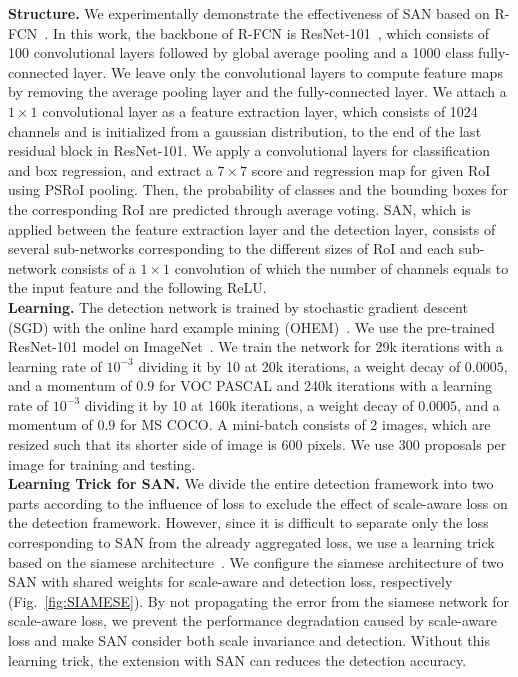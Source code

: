\documentclass[runningheads]{llncs}
\begin{document}
\noindent
\textbf{Structure.}
We experimentally demonstrate the effectiveness of SAN based on R-FCN~\cite{li2016r}.
In this work, the backbone of R-FCN is ResNet-101~\cite{he2016deep}, which consists of 100 convolutional layers followed by global average pooling and a 1000 class fully-connected layer.
We leave only the convolutional layers to compute feature maps by removing the average pooling layer and the fully-connected layer.
We attach a $1\times1$ convolutional layer as a feature extraction layer, which consists of 1024 channels and is initialized from a gaussian distribution, to the end of the last residual block in ResNet-101.
We apply a convolutional layers for classification and box regression, and extract a $7\times7$ score and regression map for given RoI using PSRoI pooling.
Then, the probability of classes and the bounding boxes for the corresponding RoI are predicted through average voting.
SAN, which is applied between the feature extraction layer and the detection layer, consists of several sub-networks corresponding to the different sizes of RoI and each sub-network consists of a $1\times1$ convolution of which the number of channels equals to the input feature and the following ReLU.
\\

\noindent\textbf{Learning.}
The detection network is trained by stochastic gradient descent (SGD) with the online hard example mining (OHEM)~\cite{shrivastava2016training}.
We use the pre-trained ResNet-101 model on ImageNet~\cite{russakovsky2015imagenet}.
We train the network for
29k iterations with a learning rate of $10^{-3}$ dividing it by 10 at 20k iterations, a weight decay of $0.0005$, and a momentum of $0.9$ for VOC PASCAL
and
240k iterations with a learning rate of $10^{-3}$ dividing it by 10 at 160k iterations, a weight decay of $0.0005$, and a momentum of $0.9$ for MS COCO.
A mini-batch consists of 2 images, which are resized such that its shorter side of image is 600 pixels.
We use 300 proposals per image for training and testing.
\\


\noindent
\textbf{Learning Trick for SAN.}
We divide the entire detection framework into two parts according to the influence of loss to exclude the effect of scale-aware loss on the detection framework.
However, since it is difficult to separate only the loss corresponding to SAN from the already aggregated loss, we use a learning trick based on the siamese architecture~\cite{chopra2005learning}.
We configure the siamese architecture of two SAN with shared weights for scale-aware and detection loss, respectively (Fig.~\ref{fig:SIAMESE}).
By not propagating the error from the siamese network for scale-aware loss, we prevent the performance degradation caused by scale-aware loss and make SAN consider both scale invariance and detection.
Without this learning trick, the extension with SAN can reduces the detection accuracy.
\\
\end{document}
